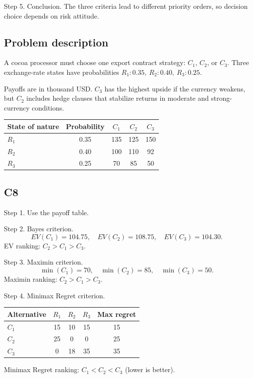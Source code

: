 \begin{ExamProblems}
		Step 5. Conclusion.
		The three criteria lead to different priority orders, so decision choice depends on risk attitude.

		\newpage
		\item\leavevmode\par
		\subsection*{Problem description}
		A cocoa processor must choose one export contract strategy: $C_1$, $C_2$, or $C_3$. Three exchange-rate states have probabilities $R_1:0.35,\ R_2:0.40,\ R_3:0.25$.

		Payoffs are in thousand USD. $C_3$ has the highest upside if the currency weakens, but $C_2$ includes hedge clauses that stabilize returns in moderate and strong-currency conditions.
		\begin{center}
			\begin{tabular}{l c c c c}
				\toprule
				State of nature & Probability & $C_1$ & $C_2$ & $C_3$ \\
				\midrule
				$R_1$ & 0.35 & 135 & 125 & 150 \\
				$R_2$ & 0.40 & 100 & 110 & 92 \\
				$R_3$ & 0.25 & 70 & 85 & 50 \\
				\bottomrule
			\end{tabular}
		\end{center}

		\subsection*{C8}
		Step 1. Use the payoff table.

		Step 2. Bayes criterion.
		\[
		EV(C_1)=104.75,\quad EV(C_2)=108.75,\quad EV(C_3)=104.30.
		\]
		EV ranking: $C_2>C_1>C_3$.

		Step 3. Maximin criterion.
		\[
		\min(C_1)=70,\quad \min(C_2)=85,\quad \min(C_3)=50.
		\]
		Maximin ranking: $C_2>C_1>C_3$.

		Step 4. Minimax Regret criterion.
		\begin{center}
			\begin{tabular}{l c c c c}
				\toprule
				Alternative & $R_1$ & $R_2$ & $R_3$ & Max regret \\
				\midrule
				$C_1$ & 15 & 10 & 15 & 15 \\
				$C_2$ & 25 & 0 & 0 & 25 \\
				$C_3$ & 0 & 18 & 35 & 35 \\
				\bottomrule
			\end{tabular}
		\end{center}
		Minimax Regret ranking: $C_1<C_2<C_3$ (lower is better).


\end{ExamProblems}
